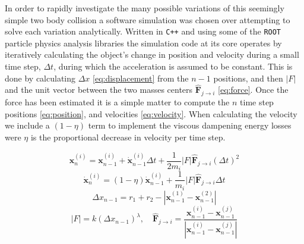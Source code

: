 \documentclass[aps,prl,floatfix,preprint,nofootinbib]{revtex4}
\begin{document}
In order to rapidly investigate the many possible variations of this seemingly simple two body collision a software simulation was chosen over attempting to solve each variation analytically. Written in \texttt{C++} and using some of the \texttt{ROOT}~\cite{ref_root} particle physics analysis libraries the simulation code at its core operates by iteratively calculating the object's change in position and velocity during a small time step, $\Delta t$, during which the acceleration is assumed to be constant. This is done by calculating $\Delta x$ \eqref{eq:displacement} from the $n-1$ positions, and then $\left|F\right|$ and the unit vector between the two masses centers $\mathbf{\hat{F}}_{j\rightarrow i}$ \eqref{eq:force}. Once the force has been estimated it is a simple matter to compute the $n$ time step positions \eqref{eq:position}, and velocities \eqref{eq:velocity}. When calculating the velocity we include a $\left(1-\eta\right)$ term to implement the viscous dampening energy losses were $\eta$ is the proportional decrease in velocity per time step.

\begin{equation}\label{eq:position}
  \mathbf{x}^{(i)}_{n} = \mathbf{x}^{(i)}_{n-1} + \dot{\mathbf{x}}^{(i)}_{n-1} \Delta t + \frac{1}{2m_i} \left| F \right| \mathbf{\hat{F}}_{j\rightarrow i} \left(\Delta t\right)^2
\end{equation}
\begin{equation}\label{eq:velocity}
  \dot{\mathbf{x}}^{(i)}_{n} = (1-\eta)\dot{\mathbf{x}}^{(i)}_{n-1} + \frac{1}{m_i} \left| F \right| \mathbf{\hat{F}}_{j\rightarrow i} \Delta t
\end{equation}
\begin{equation}\label{eq:displacement}
  \Delta x_{n-1} = r_1 + r_2 - \left| \mathbf{x}^{(1)}_{n-1}-\mathbf{x}^{(2)}_{n-1} \right|
\end{equation}
\begin{equation}\label{eq:force}
  \left| F \right| = k \left(\Delta x_{n-1}\right)^{\lambda},\quad \mathbf{\hat{F}}_{j\rightarrow i} = \frac{\mathbf{x}^{(i)}_{n-1}-\mathbf{x}^{(j)}_{n-1}}{\left|\mathbf{x}^{(i)}_{n-1}-\mathbf{x}^{(j)}_{n-1}\right|}
\end{equation}
\end{document}
